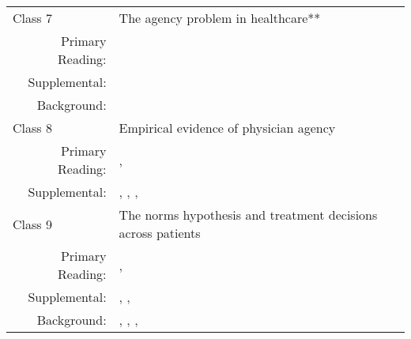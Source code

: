\documentclass{article}
\begin{document}
\begin{longtable}{lp{11cm}}
  \hline\hline
  Class 7 & The agency problem in healthcare** \\
        \multicolumn{1}{r}{Primary Reading:} & \cite{mcguire2000} \\
        \multicolumn{1}{r}{Supplemental:} & \cite{chandra2011} \\
        \multicolumn{1}{r}{Background:} &  \cite{grossman1983} \\
  \hline
  Class 8 & Empirical evidence of physician agency \\
        \multicolumn{1}{r}{Primary Reading:} & \cite{gruber1996}, \cite{clemens2017} \\
        \multicolumn{1}{r}{Supplemental:} & \cite{clemens2014}, \cite{baker2016}, \cite{gaynor2016}, \cite{beckert2018} \\
  \hline 
  Class 9 & The norms hypothesis and treatment decisions across patients \\
        \multicolumn{1}{r}{Primary Reading:} & \cite{chandra2007}, \cite{baicker2013} \\
        \multicolumn{1}{r}{Supplemental:} & \cite{mcguire1991}, \cite{glied2002}, \cite{baker2003}  \\
        \multicolumn{1}{r}{Background:} & \cite{newhouse1978}, \cite{frank2007}, \cite{chernew2010}, \cite{landon2017} \\

  




\end{longtable}
\end{document}
